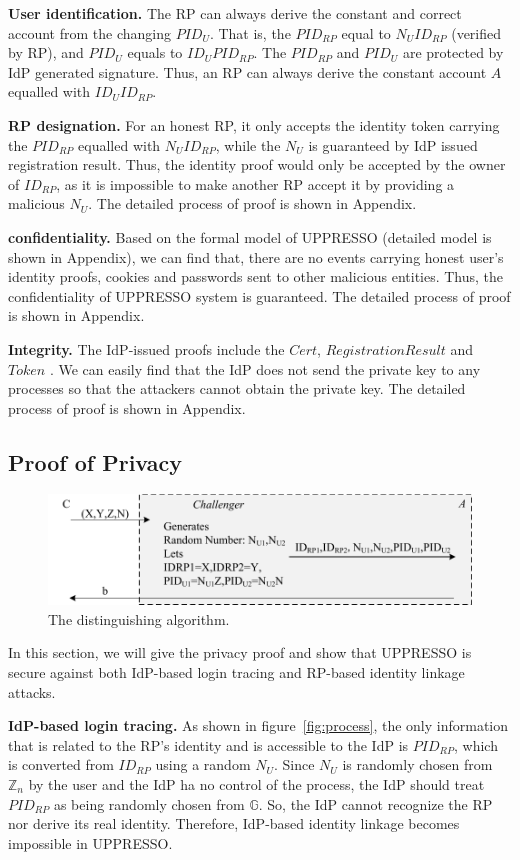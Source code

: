 \noindent\textbf{User identification.}
The RP can always derive the constant and correct account from the changing $PID_U$. That is, the $PID_{RP}$ equal to $N_UID_{RP}$ (verified by RP), and $PID_U$ equals to $ID_UPID_{RP}$. The $PID_{RP}$ and $PID_U$ are protected by IdP generated signature. Thus, an RP can always derive the constant account $A$ equalled with $ID_UID_{RP}$.

\noindent\textbf{RP designation.}
For an honest RP, it only accepts the identity token carrying the $PID_{RP}$ equalled with $N_UID_{RP}$, while the $N_U$ is guaranteed by IdP issued registration result. Thus, the identity proof would only be accepted by the owner of $ID_{RP}$, as it is impossible to make another RP accept it by providing a malicious $N_U$. The detailed process of proof is shown in Appendix.

\noindent\textbf{confidentiality.}
Based on the formal model of UPPRESSO (detailed model is shown in Appendix), we can find that, there are no events carrying honest user's identity proofs, cookies and passwords sent to other malicious entities. Thus, the confidentiality of UPPRESSO system is guaranteed. The detailed process of proof is shown in Appendix.

\noindent\textbf{Integrity.}
The IdP-issued proofs include the $Cert$, $RegistrationResult$ and $Token$ . We can easily find that the IdP does not send the private key to any processes so that the attackers cannot obtain the private key. The detailed process of proof is shown in Appendix.

\subsection{Proof of Privacy}
\begin{figure}
  \centering
  \includegraphics[width=0.65\linewidth]{fig/dalgorithm.pdf}
  \caption{The distinguishing algorithm.}
  \vspace{-5mm}
  \label{fig:dalgorithm}
\end{figure}
In this section, we will give the privacy proof and show that UPPRESSO is secure against both IdP-based login tracing and RP-based identity linkage attacks.

\noindent\textbf{IdP-based login tracing.}
As shown in figure~\ref{fig:process}, the only information that is related to the RP's identity and is accessible to the IdP is $PID_{RP}$, which is converted from $ID_{RP}$ using a random $N_U$. Since $N_U$ is randomly chosen from $\mathbb{Z}_n$ by the user and the IdP ha no control of the process, the IdP should treat $PID_{RP}$ as being randomly chosen from $\mathbb{G}$. So, the IdP cannot recognize the RP nor derive its real identity. Therefore, IdP-based identity linkage becomes impossible in UPPRESSO.

